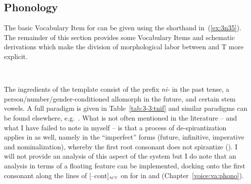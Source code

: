 \begin{exe}
\begin{xlist}
\begin{xlist}
\begin{exe}
\begin{xlist}
\begin{xlist}
\begin{exe}
\begin{xlist}
\begin{xlist}
\begin{exe}
\begin{exe}
\begin{xlist}
\begin{exe}
\begin{exe}
\begin{xlist}
\begin{exe}
\begin{exe}
\begin{exe}
\begin{exe}
\begin{exe}
\begin{xlist}
\begin{exe}
\begin{xlist}
\begin{exe}
\begin{exe}
\begin{xlist}
\begin{exe}
\begin{xlist}
\begin{exe}
\begin{exe}
\begin{exe}
\begin{xlist}
\begin{exe}
\begin{exe}
\begin{exe}
\begin{xlist}
\begin{exe}
\begin{xlist}
\begin{exe}
\begin{xlist}
\begin{exe}
\begin{xlist}
\begin{exe}
\begin{exe}
	\subsection{Phonology} \label{vz:vz:phono}
The basic Vocabulary Item for {\vz} can be given using the shorthand in~(\ref{ex:3n35}). The remainder of this section provides some Vocabulary Items and schematic derivations which make the division of morphological labor between {\vz} and T more explicit.
 \begin{exe}
\ex  \label{ex:3n35}{\vz} \lra~{\tnif} 
 \z 

\label{r1:3:3}The ingredients of the template {\tnif} consist of the prefix \emph{ni-} in the past tense, a person/number/gender-conditioned allomorph in the future, and certain stem vowels. A full paradigm is given in Table~\ref{tab:3-3:tnif} and similar paradigms can be found elsewhere, e.g.~\cite{schwarzwald08}. What is not often mentioned in the literature -- and what I have failed to note in \cite{kastner18nllt} myself -- is that a process of de-spirantization applies in {\tnif} as well, namely in the ``imperfect'' forms (future, infinitive, imperative and nominalization), whereby the first root consonant does not spirantize (). I will not provide an analysis of this aspect of the system but I do note that an analysis in terms of a floating feature can be implemented, docking onto the first consonant along the lines of [--cont]$_{\text{\gsc{ACT}}}$ on  for {\va} in {\tpie} and {\thit} (Chapter~\ref{voice:va:phono}).


\end{exe}
\end{exe}
\end{exe}
\end{xlist}
\end{exe}
\end{xlist}
\end{exe}
\end{xlist}
\end{exe}
\end{xlist}
\end{exe}
\end{exe}
\end{exe}
\end{xlist}
\end{exe}
\end{exe}
\end{exe}
\end{xlist}
\end{exe}
\end{xlist}
\end{exe}
\end{exe}
\end{xlist}
\end{exe}
\end{xlist}
\end{exe}
\end{exe}
\end{exe}
\end{exe}
\end{exe}
\end{xlist}
\end{exe}
\end{exe}
\end{xlist}
\end{exe}
\end{exe}
\end{xlist}
\end{xlist}
\end{exe}
\end{xlist}
\end{xlist}
\end{exe}
\end{xlist}
\end{xlist}
\end{exe}
